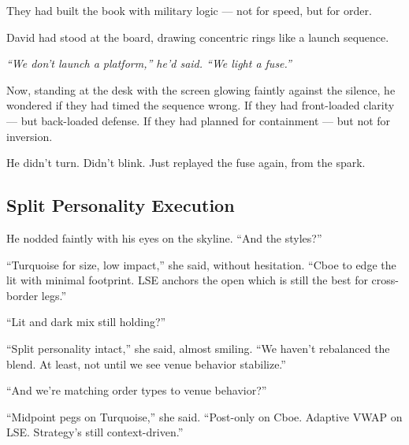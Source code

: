 \medskip

They had built the book with military logic — not for speed, but for order.


David had stood at the board, drawing concentric rings like a launch sequence.

\textit{“We don’t launch a platform,” he’d said. “We light a fuse.”}

Now, standing at the desk with the screen glowing faintly against the silence,
he wondered if they had timed the sequence wrong.
If they had front-loaded clarity — but back-loaded defense.
If they had planned for containment — but not for inversion.

He didn’t turn.
Didn’t blink.
Just replayed the fuse again, from the spark.




\subsection{Split Personality Execution}

He nodded faintly with his eyes on the skyline. ``And the styles?''


``Turquoise for size, low impact,'' she said, without hesitation. ``Cboe to edge the lit with minimal footprint. 
LSE anchors the open which is still the best for cross-border legs.''

``Lit and dark mix still holding?''

``Split personality intact,'' she said, almost smiling. ``We haven’t rebalanced the blend. At least, not 
until we see venue behavior stabilize.''

``And we’re matching order types to venue behavior?''

``Midpoint pegs on Turquoise,'' she said. ``Post-only on Cboe. Adaptive VWAP on LSE. Strategy’s still 
context-driven.''

\medskip

